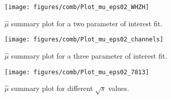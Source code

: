 \begin{figure}[!htbp]\captionsetup{justification=centering}
  \begin{center}
  \texttt{[image: figures/comb/Plot\_mu\_eps02\_WHZH]}
  \caption{$\hat{\mu}$ summary plot for a two parameter of interest fit.}
  \label{fig:combmushat1}
  \end{center}
\end{figure}
\begin{figure}[!htbp]\captionsetup{justification=centering}
  \begin{center}
  \texttt{[image: figures/comb/Plot\_mu\_eps02\_channels]}
  \caption{$\hat{\mu}$ summary plot for a three parameter of interest fit.}
  \label{fig:combmushat2}
  \end{center}
\end{figure}
\begin{figure}[!htbp]\captionsetup{justification=centering}
  \begin{center}
  \texttt{[image: figures/comb/Plot\_mu\_eps02\_7813]}
  \caption{$\hat{\mu}$ summary plot for different $\sqrt{s}$ values.}
  \label{fig:combmushat3}
  \end{center}
\end{figure}

